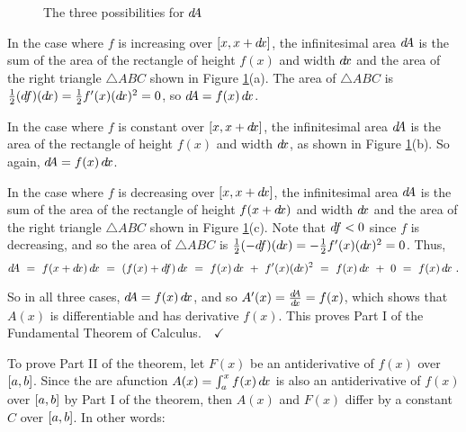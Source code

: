 \begin{figure}[ht]
{}
 \caption[]{\quad The three possibilities for $d\negmedspace A$}
 \label{fig:ftc1dA3}
\end{figure}

In the case where $f$ is increasing over $\lbrack x,x+d\!x \rbrack$, the infinitesimal
area $d\negmedspace A$ is the sum of the area of the rectangle of height $f(x)$ and width
$d\!x$ and the area of the right triangle $\triangle ABC$ shown in Figure
\ref{fig:ftc1dA3}(a). The area of $\triangle ABC$ is $\frac{1}{2}(d\negmedspace f)(d\!x)
= \frac{1}{2}f'(x)(d\!x)^2 = 0$, so $d\negmedspace A = f(x)\,d\!x$.

In the case where $f$ is constant over $\lbrack x,x+d\!x \rbrack$, the infinitesimal
area $d\negmedspace A$ is the area of the rectangle of height $f(x)$ and width $d\!x$, as
shown in Figure \ref{fig:ftc1dA3}(b). So again, $d\negmedspace A = f(x)\,d\!x$.

In the case where $f$ is decreasing over $\lbrack x,x+d\!x \rbrack$, the infinitesimal
area $d\negmedspace A$ is the sum of the area of the rectangle of height $f(x+d\!x)$ and
width $d\!x$ and the area of the right triangle $\triangle ABC$ shown in Figure
\ref{fig:ftc1dA3}(c). Note that $d\negmedspace f < 0$ since $f$ is decreasing, and so the
area of $\triangle ABC$ is $\frac{1}{2}(-d\negmedspace f)(d\!x) = -\frac{1}{2}f'(x)(d\!x)^2
= 0$. Thus,
\[
\dA ~=~ f(x+\dx)\,\dx ~=~ (f(x) + \df)\,\dx ~=~
        f(x)\,\dx ~+~ f'(x)(\dx)^2 ~=~ f(x)\,\dx ~+~ 0 ~=~ f(x)\,\dx ~.
\]

So in all three cases, $d\negmedspace A = f(x)\,d\!x$, and so $A'(x) = \frac{d\negmedspace A}{d\!x} = f(x)$,
which shows that $A(x)$ is differentiable and has derivative $f(x)$.
This proves Part I of the Fundamental Theorem of Calculus.$\quad\checkmark$

To prove Part II of the theorem, let $F(x)$ be an antiderivative of $f(x)$ over
$\lbrack a,b \rbrack$. Since the are afunction $A(x) = \int_a^x f(x)\,d\!x$ is also an
antiderivative of
$f(x)$ over $\lbrack a,b \rbrack$ by Part I of the theorem, then $A(x)$ and $F(x)$
differ by a constant $C$ over $\lbrack a,b \rbrack$. In other words:

